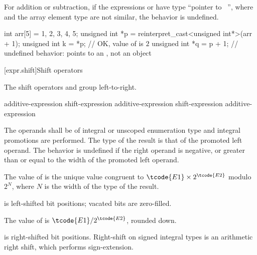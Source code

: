 \pnum
For addition or subtraction, if the expressions  or  have
type ``pointer to \cv{}~'', where  and the array element type
are not similar, the behavior is undefined.
\begin{example}
\begin{codeblock}
int arr[5] = {1, 2, 3, 4, 5};
unsigned int *p = reinterpret_cast<unsigned int*>(arr + 1);
unsigned int k = *p;            // OK, value of  is $2$
unsigned int *q = p + 1;        // undefined behavior:  points to an , not an  object
\end{codeblock}
\end{example}

[expr.shift]{Shift operators}

\pnum
{}%
%
%
%
%
%
The shift operators \tcode{<<} and \tcode{>>} group left-to-right.

%
%
%
%
%
\begin{bnf}
\br
    additive-expression\br
    shift-expression \terminal{<<} additive-expression\br
    shift-expression \terminal{>>} additive-expression
\end{bnf}

The operands shall be of integral or unscoped enumeration type and integral
promotions are performed. The type of the result is that of the promoted
left operand.
%
The behavior is undefined if the right operand is negative, or greater
than or equal to the width of the promoted left operand.

\pnum
The value of  is the unique value congruent to
$\tcode{E1} \times 2^\tcode{E2}$ modulo $2^N$,
where $N$ is the width of the type of the result.
\begin{note}
 is left-shifted  bit positions;
vacated bits are zero-filled.
\end{note}

\pnum
The value of  is $\tcode{E1} / 2^\tcode{E2}$, rounded down.
\begin{note}
 is right-shifted  bit positions.
Right-shift on signed integral types is an arithmetic right shift,
which performs sign-extension.
\end{note}

